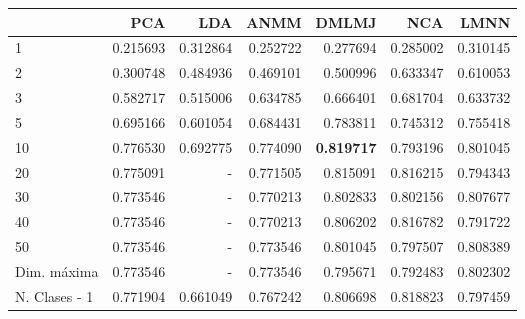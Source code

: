 \begin{tabular}{lrrrrrr}
\toprule
{} &       PCA &       LDA &      ANMM &     DMLMJ &       NCA &      LMNN \\
\midrule
1             &  0.215693 &  0.312864 &  0.252722 &  0.277694 &  0.285002 &  0.310145 \\
2             &  0.300748 &  0.484936 &  0.469101 &  0.500996 &  0.633347 &  0.610053 \\
3             &  0.582717 &  0.515006 &  0.634785 &  0.666401 &  0.681704 &  0.633732 \\
5             &  0.695166 &  0.601054 &  0.684431 &  0.783811 &  0.745312 &  0.755418 \\
10            &  0.776530 &  0.692775 &  0.774090 &  \textbf{0.819717} &  0.793196 &  0.801045 \\
20            &  0.775091 &  -        &  0.771505 &  0.815091 &  0.816215 &  0.794343 \\
30            &  0.773546 &  -        &  0.770213 &  0.802833 &  0.802156 &  0.807677 \\
40            &  0.773546 &  -        &  0.770213 &  0.806202 &  0.816782 &  0.791722 \\
50            &  0.773546 &  -        &  0.773546 &  0.801045 &  0.797507 &  0.808389 \\
Dim. máxima   &  0.773546 &  -        &  0.773546 &  0.795671 &  0.792483 &  0.802302 \\
N. Clases - 1 &  0.771904 &  0.661049 &  0.767242 &  0.806698 &  0.818823 &  0.797459 \\
\bottomrule
\end{tabular}
